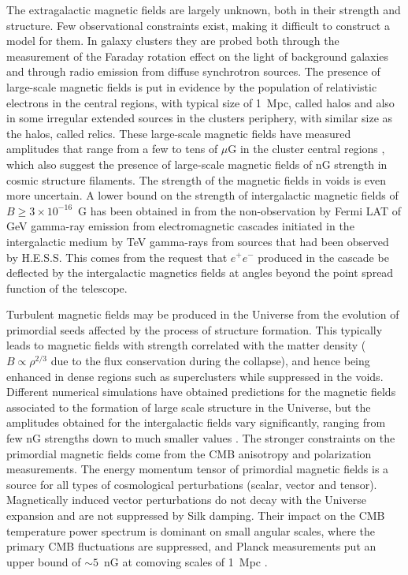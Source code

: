 \documentclass[twoside,12pt]{article}
\begin{document}
The  extragalactic magnetic fields are largely unknown, both in their strength and structure. Few  observational  constraints exist, making it difficult to construct a model for them. In galaxy clusters they are probed  both through the measurement of the Faraday rotation effect on the light of background galaxies and through radio emission from diffuse synchrotron sources. The presence of large-scale magnetic fields is put in evidence by the population of relativistic electrons in the central regions, with typical size of 1~Mpc, called halos and also in some irregular extended sources in the clusters periphery, with similar size as the halos, called relics. These large-scale magnetic fields have measured amplitudes that range from a few to tens of $\mu$G in the cluster central regions \cite{fe12}, which also suggest the presence of large-scale magnetic fields of nG strength in cosmic structure filaments. The strength of the magnetic fields in voids is even more uncertain. A lower bound on the strength of intergalactic magnetic fields of  $B\ge 3\times 10^{-16}$~G  has been obtained in \cite{nv10} from the non-observation by Fermi LAT of GeV gamma-ray emission from electromagnetic cascades initiated in the intergalactic medium by TeV gamma-rays  from sources that had been observed by H.E.S.S. This comes from the request that $e^+ e^-$ produced in the cascade be deflected by the intergalactic magnetics fields at angles beyond the point spread function of the telescope. 

Turbulent magnetic fields may be produced in the Universe from the evolution of primordial seeds affected by the process of structure formation. This typically leads to magnetic fields with strength correlated with the matter density ($B\propto \rho^{2/3}$ due to the flux conservation during the collapse), and hence being enhanced in dense regions such as superclusters while suppressed in the voids. 
Different numerical simulations have obtained  predictions for the magnetic fields associated to the formation of large scale structure in the Universe, but the  amplitudes obtained for the intergalactic fields vary significantly, ranging from few nG strengths down to much smaller values \cite{si04,do04}.
The stronger constraints on the primordial magnetic fields come from the CMB anisotropy and polarization measurements. The energy momentum tensor of primordial magnetic fields is a  source for all types of cosmological perturbations (scalar, vector and tensor).  Magnetically induced   vector  perturbations do not  decay with the Universe expansion and are not suppressed by Silk damping. Their impact on the CMB temperature power spectrum is dominant on small angular scales, where the primary CMB fluctuations are  suppressed, and Planck measurements put an upper bound of $\sim 5$~nG at comoving scales of 1~Mpc \cite{pl15}.
\end{document}

